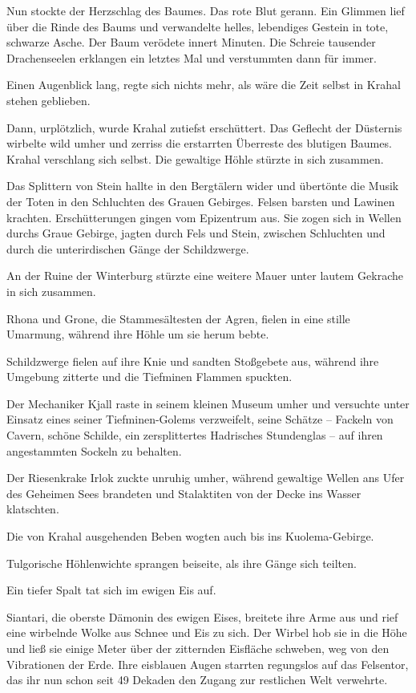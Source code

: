 Nun stockte der Herzschlag des Baumes. Das rote Blut gerann. Ein Glimmen lief über die Rinde des Baums und verwandelte helles, lebendiges Gestein in tote, schwarze Asche. Der Baum verödete innert Minuten. Die Schreie tausender Drachenseelen erklangen ein letztes Mal und verstummten dann für immer.

Einen Augenblick lang, regte sich nichts mehr, als wäre die Zeit selbst in Krahal stehen geblieben.

Dann, urplötzlich, wurde Krahal zutiefst erschüttert. Das Geflecht der Düsternis wirbelte wild umher und zerriss die erstarrten Überreste des blutigen Baumes. Krahal verschlang sich selbst. Die gewaltige Höhle stürzte in sich zusammen.

Das Splittern von Stein hallte in den Bergtälern wider und übertönte die Musik der Toten in den Schluchten des Grauen Gebirges. Felsen barsten und Lawinen krachten. Erschütterungen gingen vom Epizentrum aus. Sie zogen sich in Wellen durchs Graue Gebirge, jagten durch Fels und Stein, zwischen Schluchten und durch die unterirdischen Gänge der Schildzwerge.

An der Ruine der Winterburg stürzte eine weitere Mauer unter lautem Gekrache in sich zusammen.

Rhona und Grone, die Stammesältesten der Agren, fielen in eine stille Umarmung, während ihre Höhle um sie herum bebte.

Schildzwerge fielen auf ihre Knie und sandten Stoßgebete aus, während ihre Umgebung zitterte und die Tiefminen Flammen spuckten.

Der Mechaniker Kjall raste in seinem kleinen Museum umher und versuchte unter Einsatz eines seiner Tiefminen-Golems verzweifelt, seine Schätze – Fackeln von Cavern, schöne Schilde, ein zersplittertes Hadrisches Stundenglas – auf ihren angestammten Sockeln zu behalten.

Der Riesenkrake Irlok zuckte unruhig umher, während gewaltige Wellen ans Ufer des Geheimen Sees brandeten und Stalaktiten von der Decke ins Wasser klatschten.

Die von Krahal ausgehenden Beben wogten auch bis ins Kuolema-Gebirge.

Tulgorische Höhlenwichte sprangen beiseite, als ihre Gänge sich teilten.

Ein tiefer Spalt tat sich im ewigen Eis auf.

Siantari, die oberste Dämonin des ewigen Eises, breitete ihre Arme aus und rief eine wirbelnde Wolke aus Schnee und Eis zu sich. Der Wirbel hob sie in die Höhe und ließ sie einige Meter über der zitternden Eisfläche schweben, weg von den Vibrationen der Erde. Ihre eisblauen Augen starrten regungslos auf das Felsentor, das ihr nun schon seit 49 Dekaden den Zugang zur restlichen Welt verwehrte.


